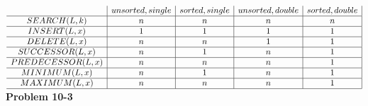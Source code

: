 \documentclass{article}
\begin{document}
$
\begin{array}{c|c|c|c|c|}
&unsorted,single& sorted,single&unsorted,double&sorted,double\\
\hline
SEARCH(L,k)&n&n&n&n\\
\hline
INSERT(L,x)&1&1&1&1\\
\hline
DELETE(L,x)&n&n&1&1\\
\hline
SUCCESSOR(L,x)&n&1&n&1\\
\hline
PREDECESSOR(L,x)&n&n&n&1\\
\hline
MINIMUM(L,x)&n&1&n&1\\
\hline
MAXIMUM(L,x)&n&n&n&1\\
\hline

\end{array}
$
\noindent\textbf{ Problem 10-3} \\
\end{document}
